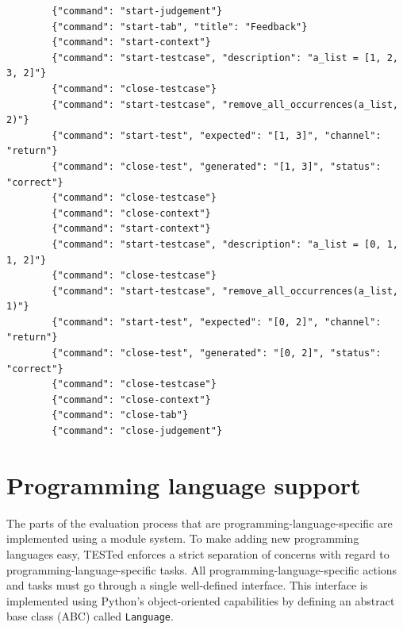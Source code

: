 \documentclass[../main]{subfiles}
\begin{document}
\begin{listing}
    \begin{verbatim}
        {"command": "start-judgement"}
        {"command": "start-tab", "title": "Feedback"}
        {"command": "start-context"}
        {"command": "start-testcase", "description": "a_list = [1, 2, 3, 2]"}
        {"command": "close-testcase"}
        {"command": "start-testcase", "remove_all_occurrences(a_list, 2)"}
        {"command": "start-test", "expected": "[1, 3]", "channel": "return"}
        {"command": "close-test", "generated": "[1, 3]", "status": "correct"}
        {"command": "close-testcase"}
        {"command": "close-context"}
        {"command": "start-context"}
        {"command": "start-testcase", "description": "a_list = [0, 1, 1, 2]"}
        {"command": "close-testcase"}
        {"command": "start-testcase", "remove_all_occurrences(a_list, 1)"}
        {"command": "start-test", "expected": "[0, 2]", "channel": "return"}
        {"command": "close-test", "generated": "[0, 2]", "status": "correct"}
        {"command": "close-testcase"}
        {"command": "close-context"}
        {"command": "close-tab"}
        {"command": "close-judgement"}
    \end{verbatim}
    \caption{
        Example of the output generated by TESTed, which is rendered in~\cref{fig:dodona}.
        Note that the names of the levels are the Dodona levels (tab, contex and testcase), instead of unit, testcase and script.
        As before, each testcase consists of two tests, the first of which has no script, while
        the second has one script (the expected return value).
    }
    \label{lst:tested-output-example}
\end{listing}

\section{Programming language support}\label{sec:programming-language-support}

The parts of the evaluation process that are programming-language-specific are implemented using a module system.
To make adding new programming languages easy, TESTed enforces a strict separation of concerns with regard to programming-language-specific tasks.
All programming-language-specific actions and tasks must go through a single well-defined interface.
This interface is implemented using Python's object-oriented capabilities by defining an abstract base class (ABC) called \texttt{Language}.
\end{document}
